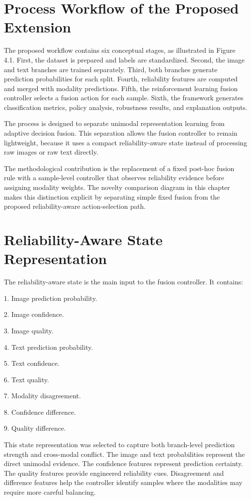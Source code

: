 \section{Process Workflow of the Proposed Extension}


The proposed workflow contains six conceptual stages, as illustrated in Figure 4.1. First, the dataset is prepared and labels are standardized. Second, the image and text branches are trained separately. Third, both branches generate prediction probabilities for each split. Fourth, reliability features are computed and merged with modality predictions. Fifth, the reinforcement learning fusion controller selects a fusion action for each sample. Sixth, the framework generates classification metrics, policy analysis, robustness results, and explanation outputs.


The process is designed to separate unimodal representation learning from adaptive decision fusion. This separation allows the fusion controller to remain lightweight, because it uses a compact reliability-aware state instead of processing raw images or raw text directly.


The methodological contribution is the replacement of a fixed post-hoc fusion rule with a sample-level controller that observes reliability evidence before assigning modality weights. The novelty comparison diagram in this chapter makes this distinction explicit by separating simple fixed fusion from the proposed reliability-aware action-selection path.


\section{Reliability-Aware State Representation}


The reliability-aware state is the main input to the fusion controller. It contains:


1. Image prediction probability.

2. Image confidence.

3. Image quality.

4. Text prediction probability.

5. Text confidence.

6. Text quality.

7. Modality disagreement.

8. Confidence difference.

9. Quality difference.


This state representation was selected to capture both branch-level prediction strength and cross-modal conflict. The image and text probabilities represent the direct unimodal evidence. The confidence features represent prediction certainty. The quality features provide engineered reliability cues. Disagreement and difference features help the controller identify samples where the modalities may require more careful balancing.


